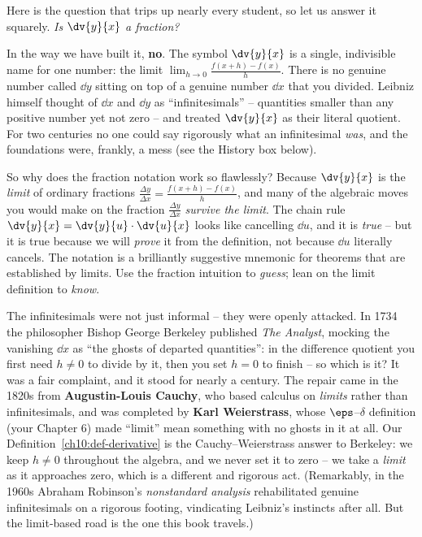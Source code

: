 \begin{happeningbox}
Here is the question that trips up nearly every student, so let us answer it
squarely. \emph{Is $\dv{y}{x}$ a fraction?}

In the way we have built it, \textbf{no}. The symbol $\dv{y}{x}$ is a single,
indivisible name for one number: the limit $\displaystyle\lim_{h\to 0}\frac{f(x+h)
-f(x)}{h}$. There is no genuine number called $\dd y$ sitting on top of a genuine
number $\dd x$ that you divided. Leibniz himself thought of $\dd x$ and $\dd y$ as
``infinitesimals'' -- quantities smaller than any positive number yet not zero --
and treated $\dv{y}{x}$ as their literal quotient. For two centuries no one could
say rigorously what an infinitesimal \emph{was}, and the foundations were, frankly,
a mess (see the History box below).

So why does the fraction notation work so flawlessly? Because $\dv{y}{x}$ is the
\emph{limit} of ordinary fractions $\frac{\Delta y}{\Delta x} = \frac{f(x+h)-f(x)}
{h}$, and many of the algebraic moves you would make on the fraction $\frac{\Delta
y}{\Delta x}$ \emph{survive the limit}. The chain rule $\dv{y}{x} = \dv{y}{u}\cdot
\dv{u}{x}$ looks like cancelling $\dd u$, and it is \emph{true} -- but it is true
because we will \emph{prove} it from the definition, not because $\dd u$ literally
cancels. The notation is a brilliantly suggestive mnemonic for theorems that are
established by limits. Use the fraction intuition to \emph{guess}; lean on the
limit definition to \emph{know}.
\end{happeningbox}

\begin{historybox}
The infinitesimals were not just informal -- they were openly attacked. In 1734
the philosopher Bishop George Berkeley published \emph{The Analyst}, mocking the
vanishing $\dd x$ as ``the ghosts of departed quantities'': in the difference
quotient you first need $h \neq 0$ to divide by it, then you set $h = 0$ to finish
-- so which is it? It was a fair complaint, and it stood for nearly a century. The
repair came in the 1820s from \textbf{Augustin-Louis Cauchy}, who based calculus
on \emph{limits} rather than infinitesimals, and was completed by \textbf{Karl
Weierstrass}, whose $\eps$--$\delta$ definition (your Chapter 6) made ``limit''
mean something with no ghosts in it at all. Our Definition~\ref{ch10:def-derivative}
is the Cauchy--Weierstrass answer to Berkeley: we keep $h \neq 0$ throughout the
algebra, and we never set it to zero -- we take a \emph{limit} as it approaches
zero, which is a different and rigorous act. (Remarkably, in the 1960s Abraham
Robinson's \emph{nonstandard analysis} rehabilitated genuine infinitesimals on a
rigorous footing, vindicating Leibniz's instincts after all. But the limit-based
road is the one this book travels.)
\end{historybox}

